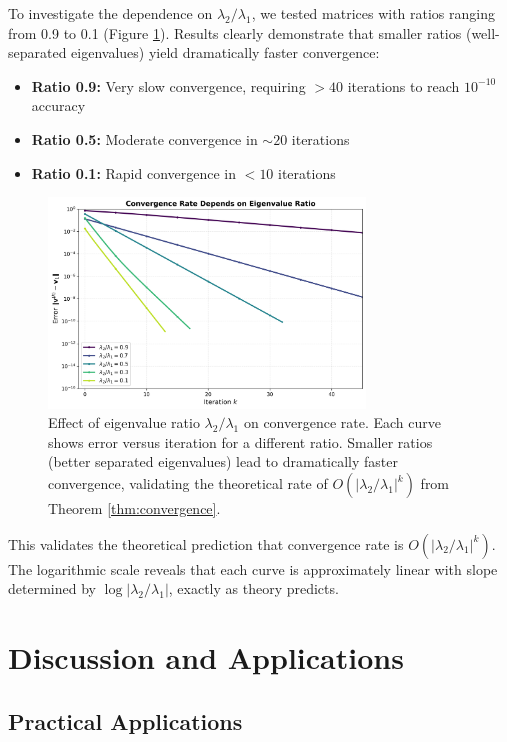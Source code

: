 \documentclass[11pt,a4paper]{article}
\begin{document}
To investigate the dependence on $\lambda_2/\lambda_1$, we tested matrices with ratios ranging from 0.9 to 0.1 (Figure \ref{fig:ratio}). Results clearly demonstrate that smaller ratios (well-separated eigenvalues) yield dramatically faster convergence:
\begin{itemize}
    \item \textbf{Ratio 0.9:} Very slow convergence, requiring $>40$ iterations to reach $10^{-10}$ accuracy
    \item \textbf{Ratio 0.5:} Moderate convergence in $\sim20$ iterations  
    \item \textbf{Ratio 0.1:} Rapid convergence in $<10$ iterations
\end{itemize}

\begin{figure}[h]
\centering
\includegraphics[width=0.75\textwidth]{eigenvalue_ratio_effect.png}
\caption{Effect of eigenvalue ratio $\lambda_2/\lambda_1$ on convergence rate. Each curve shows error versus iteration for a different ratio. Smaller ratios (better separated eigenvalues) lead to dramatically faster convergence, validating the theoretical rate of $O(|\lambda_2/\lambda_1|^k)$ from Theorem \ref{thm:convergence}.}
\label{fig:ratio}
\end{figure}

This validates the theoretical prediction that convergence rate is $O(|\lambda_2/\lambda_1|^k)$. The logarithmic scale reveals that each curve is approximately linear with slope determined by $\log|\lambda_2/\lambda_1|$, exactly as theory predicts.

\section{Discussion and Applications}
\label{sec:discussion}

\subsection{Practical Applications}
\end{document}
